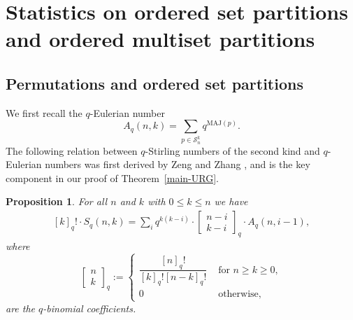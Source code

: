 \documentclass[12pt]{amsart}
\numberwithin{equation}{section}
\theoremstyle{plain}
\newtheorem{proposition}[theorem]{Proposition}
\theoremstyle{definition}
\def\MAJ{\mathrm{MAJ}}
\def\SS{\mathcal{S}}
\newcommand\qbin[3]{\left[\begin{matrix} #1 \\ #2 \end{matrix} \right]_{#3}}
\begin{document}
\section{Statistics on ordered set partitions and ordered multiset partitions}\label{sec:stat on OP}

\subsection{Permutations and ordered set partitions}\label{subsec:OP}
We first recall the $q$-Eulerian number
$$
A_q(n,k)=\sum_{p\in\SS_n^k}q^{\MAJ(p)}.
$$
The following relation between $q$-Stirling numbers of the second kind and $q$-Eulerian numbers was first derived by Zeng and Zhang \cite{ZZ}, and is the key component in our proof of Theorem~\ref{main-URG}.
\begin{proposition}
For all $n$ and $k$ with $0\le k \le n$ we have
\begin{align}\label{id:Zeng-Zhang}
[k]_q!\cdot S_q(n,k)=\sum_i q^{k(k-i)}\cdot \qbin{n-i}{k-i}{q}\cdot A_q(n,i-1),
\end{align}
where $$\qbin{n}{k}{q} := \begin{cases}\dfrac{[n]_q!}{[k]_q![n-k]_q!} & \text{ for } n\geq k\geq 0,\\[15pt] 0 & \text{ otherwise, }\end{cases}$$ are the $q$-binomial coefficients.
\end{proposition}
\end{document}
